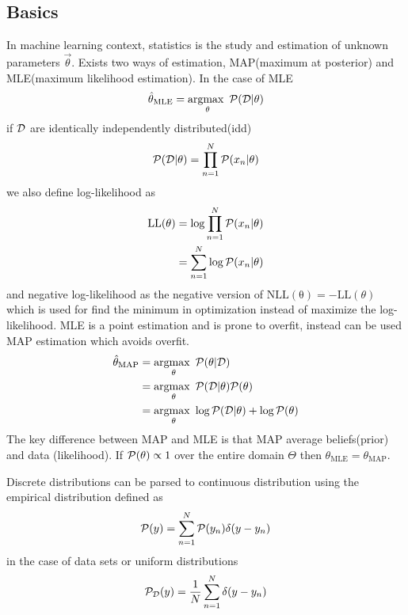 \documentclass[../../main.tex]{subfiles}
\begin{document}
\subsection{Basics}
In machine learning context, statistics is the study and estimation of unknown parameters $\vec{\theta}$. Exists two ways of estimation, MAP(maximum at posterior) and MLE(maximum likelihood estimation). In the case of MLE
\begin{equation*}
    \hat{\theta}_{\mathrm{MLE}} = \operatorname*{argmax\text{ }}_{\theta} \mathcal{P}(\mathcal{D}|\theta)
\end{equation*}
if $\mathcal{D}$ are identically independently distributed(idd)
\begin{equation*}
    \mathcal{P}(\mathcal{D}|\theta) = \prod_{n=1}^N \mathcal{P}(x_n|\theta)
\end{equation*}
we also define log-likelihood as
\begin{align*}
    \mathrm{LL}(\theta) &= \log \prod_{n=1}^N \mathcal{P}(x_n|\theta)\\
    &= \sum_{n=1}^N \log \mathcal{P}(x_n|\theta)
\end{align*}
and negative log-likelihood as the negative version of $\mathrm{NLL(\theta)}=-\mathrm{LL}(\theta)$ which is used for find the minimum in optimization instead of maximize the log-likelihood. MLE is a point estimation and is prone to overfit, instead can be used MAP estimation which avoids overfit.
\begin{align*}
    \hat{\theta}_{\mathrm{MAP}} &= \operatorname*{argmax\text{ }}_\theta \mathcal{P}(\theta|\mathcal{D})\\
    &= \operatorname*{argmax\text{ }}_\theta \mathcal{P}(\mathcal{D}|\theta)\mathcal{P}(\theta)\\
    &= \operatorname*{argmax\text{ }}_\theta \log\mathcal{P}(\mathcal{D}|\theta) + \log\mathcal{P}(\theta)
\end{align*}
The key difference between MAP and MLE is that MAP average beliefs(prior) and data (likelihood). If $\mathcal{P}(\theta)\propto 1$ over the entire domain $\Theta$  then $\theta_{\mathrm{MLE}}=\theta_\mathrm{MAP}$.

Discrete distributions can be parsed to continuous distribution using the empirical distribution defined as 
\begin{equation*}
    \mathcal{P}(y) = \sum_{n=1}^N \mathcal{P}(y_n) \delta(y-y_n)
\end{equation*}
in the case of data sets or uniform distributions
\begin{equation*}
    \mathcal{P}_{\mathcal{D}}(y) = \frac{1}{N}\sum_{n=1}^N \delta(y-y_n)
\end{equation*}
\end{document}
